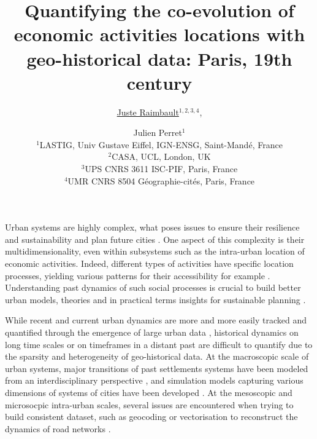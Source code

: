 \documentclass[a4paper]{article}
\begin{document}
\title{Quantifying the co-evolution of economic activities locations with geo-historical data: Paris, 19th century}

\author{
\underline{Juste Raimbault}$^{1,2,3,4}$,
\and
Julien Perret$^1$
\medskip\\
$^1$LASTIG, Univ Gustave Eiffel, IGN-ENSG, Saint-Mand{\'e}, France
\\
$^2$CASA, UCL, London, UK
\\
$^3$UPS CNRS 3611 ISC-PIF, Paris, France
\\
$^4$UMR CNRS 8504 G{\'e}ographie-cit{\'e}s, Paris, France
}
\maketitle





Urban systems are highly complex, what poses issues to ensure their resilience and sustainability and plan future cities \cite{batty2018inventing}. One aspect of this complexity is their multidimensionality, even within subsystems such as the intra-urban location of economic activities. Indeed, different types of activities have specific location processes, yielding various patterns for their accessibility for example \cite{paez2004network}. Understanding past dynamics of such social processes is crucial to build better urban models, theories and in practical terms insights for sustainable planning \cite{rozenblat2018international}.

While recent and current urban dynamics are more and more easily tracked and quantified through the emergence of large urban data \cite{kandt2021smart}, historical dynamics on long time scales or on timeframes in a distant past are difficult to quantify due to the sparsity and heterogeneity of geo-historical data. At the macroscopic scale of urban systems, major transitions of past settlements systems have been modeled from an interdisciplinary perspective \cite{sanders2018peupler}, and simulation models capturing various dimensions of systems of cities have been developed \cite{pumain2017urban}. At the mesoscopic and microsocpic intra-urban scales, several issues are encountered when trying to build consistent dataset, such as geocoding \cite{cura2018historical} or vectorisation to reconstruct the dynamics of road networks \cite{el2022urban}.
\end{document}
